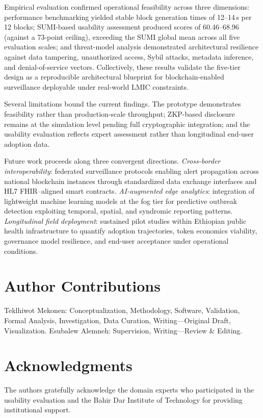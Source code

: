 \documentclass[AMA,LATO1COL]{WileyNJDv5}
\begin{document}
Empirical evaluation confirmed operational feasibility across three dimensions: performance benchmarking yielded stable block generation times of 12--14\,s per 12 blocks; SUMI-based usability assessment produced scores of 60.46--68.96 (against a 73-point ceiling), exceeding the SUMI global mean across all five evaluation scales; and threat-model analysis demonstrated architectural resilience against data tampering, unauthorized access, Sybil attacks, metadata inference, and denial-of-service vectors. Collectively, these results validate the five-tier design as a reproducible architectural blueprint for blockchain-enabled surveillance deployable under real-world LMIC constraints.

Several limitations bound the current findings. The prototype demonstrates feasibility rather than production-scale throughput; ZKP-based disclosure remains at the simulation level pending full cryptographic integration; and the usability evaluation reflects expert assessment rather than longitudinal end-user adoption data.

Future work proceeds along three convergent directions. \emph{Cross-border interoperability}: federated surveillance protocols enabling alert propagation across national blockchain instances through standardized data exchange interfaces and HL7 FHIR--aligned smart contracts. \emph{AI-augmented edge analytics}: integration of lightweight machine learning models at the fog tier for predictive outbreak detection exploiting temporal, spatial, and syndromic reporting patterns. \emph{Longitudinal field deployment}: sustained pilot studies within Ethiopian public health infrastructure to quantify adoption trajectories, token economics viability, governance model resilience, and end-user acceptance under operational conditions.


\section*{Author Contributions}
Teklhiwot Mekonen: Conceptualization, Methodology, Software, Validation, Formal Analysis, Investigation, Data Curation, Writing---Original Draft, Visualization.
Esubalew Alemneh: Supervision, Writing---Review \& Editing.

\section*{Acknowledgments}
The authors gratefully acknowledge the domain experts who participated in the usability evaluation and the Bahir Dar Institute of Technology for providing institutional support.
\end{document}

